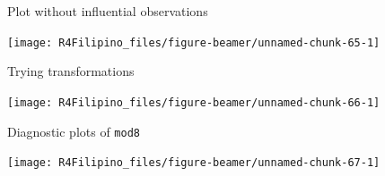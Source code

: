 \begin{frame}[fragile]{Plot without influential observations}

\begin{Shaded}
\begin{Highlighting}[]
\OperatorTok{+}\StringTok{ }\NormalTok{()}
\end{Highlighting}
\end{Shaded}

\begin{center}\texttt{[image: R4Filipino\_files/figure-beamer/unnamed-chunk-65-1]} \end{center}

\end{frame}

\begin{frame}[fragile]{Trying transformations}

\begin{Shaded}
\begin{Highlighting}[]
\StringTok{ }\OperatorTok{~}
\OperatorTok{~}
\end{Highlighting}
\end{Shaded}

\begin{center}\texttt{[image: R4Filipino\_files/figure-beamer/unnamed-chunk-66-1]} \end{center}

\end{frame}

\begin{frame}[fragile]{Diagnostic plots of \texttt{mod8}}

\begin{Shaded}
\begin{Highlighting}[]
\NormalTok{(}\NormalTok{(}\NormalTok{,}\NormalTok{))}
\end{Highlighting}
\end{Shaded}

\begin{center}\texttt{[image: R4Filipino\_files/figure-beamer/unnamed-chunk-67-1]} \end{center}

\end{frame}

